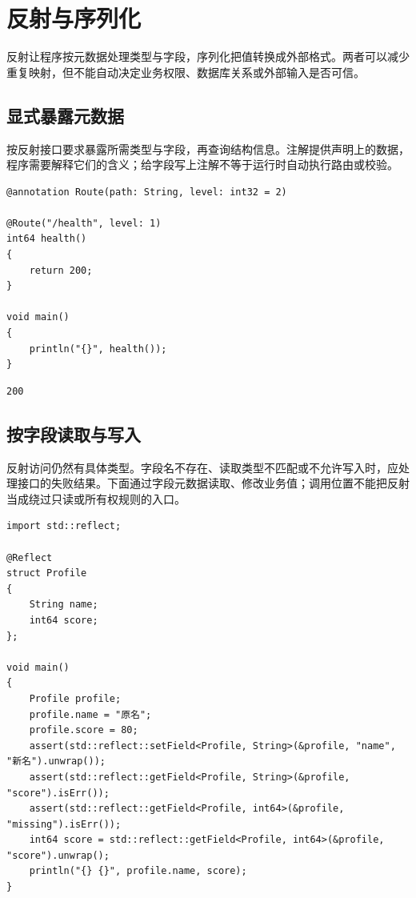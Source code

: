 \chapter{反射与序列化}
\label{ch:20}

反射让程序按元数据处理类型与字段，序列化把值转换成外部格式。两者可以减少重复映射，但不能自动决定业务权限、数据库关系或外部输入是否可信。

\section{显式暴露元数据}

按反射接口要求暴露所需类型与字段，再查询结构信息。注解提供声明上的数据，程序需要解释它们的含义；给字段写上注解不等于运行时自动执行路由或校验。

\par
\medskip
\begin{lstlisting}[style=chali]
@annotation Route(path: String, level: int32 = 2)

@Route("/health", level: 1)
int64 health()
{
    return 200;
}

void main()
{
    println("{}", health());
}
\end{lstlisting}
\par
\medskip

\par
\medskip
\begin{lstlisting}[style=out]
200
\end{lstlisting}
\par
\medskip

\section{按字段读取与写入}

反射访问仍然有具体类型。字段名不存在、读取类型不匹配或不允许写入时，应处理接口的失败结果。下面通过字段元数据读取、修改业务值；调用位置不能把反射当成绕过只读或所有权规则的入口。

\par
\medskip
\begin{lstlisting}[style=chali]
import std::reflect;

@Reflect
struct Profile
{
    String name;
    int64 score;
};

void main()
{
    Profile profile;
    profile.name = "原名";
    profile.score = 80;
    assert(std::reflect::setField<Profile, String>(&profile, "name", "新名").unwrap());
    assert(std::reflect::getField<Profile, String>(&profile, "score").isErr());
    assert(std::reflect::getField<Profile, int64>(&profile, "missing").isErr());
    int64 score = std::reflect::getField<Profile, int64>(&profile, "score").unwrap();
    println("{} {}", profile.name, score);
}
\end{lstlisting}
\par
\medskip

